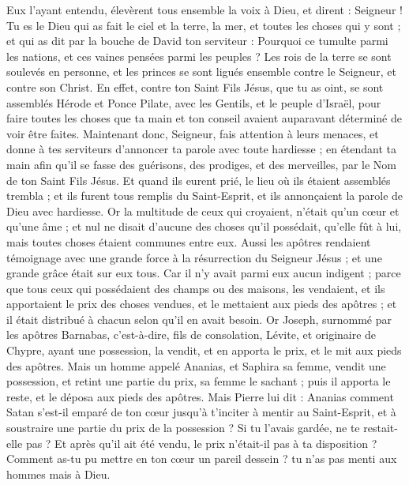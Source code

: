 \begin{multicols}{2}
Eux l'ayant entendu, élevèrent tous ensemble la voix à Dieu, et dirent : Seigneur ! Tu es le Dieu qui as fait le ciel et la terre, la mer, et toutes les choses qui y sont ;
et qui as dit par la bouche de David ton serviteur : Pourquoi ce tumulte parmi les nations, et ces vaines pensées parmi les peuples ?
Les rois de la terre se sont soulevés en personne, et les princes se sont ligués ensemble contre le Seigneur, et contre son Christ.
En effet, contre ton Saint Fils Jésus, que tu as oint, se sont assemblés Hérode et Ponce Pilate, avec les Gentils, et le peuple d'Israël,
pour faire toutes les choses que ta main et ton conseil avaient auparavant déterminé de voir être faites.
Maintenant donc, Seigneur, fais attention à leurs menaces, et donne à tes serviteurs d'annoncer ta parole avec toute hardiesse ;
en étendant ta main afin qu'il se fasse des guérisons, des prodiges, et des merveilles, par le Nom de ton Saint Fils Jésus.
Et quand ils eurent prié, le lieu où ils étaient assemblés trembla ; et ils furent tous remplis du Saint-Esprit, et ils annonçaient la parole de Dieu avec hardiesse.
Or la multitude de ceux qui croyaient, n'était qu'un cœur et qu'une âme ; et nul ne disait d'aucune des choses qu'il possédait, qu'elle fût à lui, mais toutes choses étaient communes entre eux.
Aussi les apôtres rendaient témoignage avec une grande force à la résurrection du Seigneur Jésus ; et une grande grâce était sur eux tous.
Car il n'y avait parmi eux aucun indigent ; parce que tous ceux qui possédaient des champs ou des maisons, les vendaient, et ils apportaient le prix des choses vendues,
et le mettaient aux pieds des apôtres ; et il était distribué à chacun selon qu'il en avait besoin.
Or Joseph, surnommé par les apôtres Barnabas, c'est-à-dire, fils de consolation, Lévite, et originaire de Chypre,
ayant une possession, la vendit, et en apporta le prix, et le mit aux pieds des apôtres.
\VerseOne{}Mais un homme appelé Ananias, et Saphira sa femme, vendit une possession,
et retint une partie du prix, sa femme le sachant ; puis il apporta le reste, et le déposa aux pieds des apôtres.
Mais Pierre lui dit : Ananias comment Satan s'est-il emparé de ton cœur jusqu'à t'inciter à mentir au Saint-Esprit, et à soustraire une partie du prix de la possession ?
Si tu l'avais gardée, ne te restait-elle pas ? Et après qu'il ait été vendu, le prix n'était-il pas à ta disposition ? Comment as-tu pu mettre en ton cœur un pareil dessein ? tu n'as pas menti aux hommes mais à Dieu.

\end{multicols}
